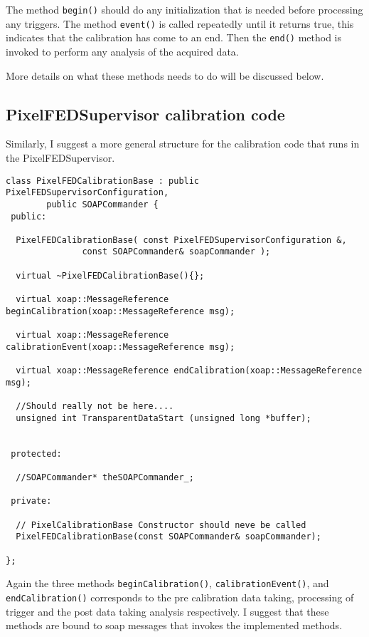 The method {\tt begin()} should do any initialization that 
is needed before processing any triggers. The method {\tt event()}
is called repeatedly until it returns true, this indicates that
the calibration has come to an end.
Then the {\tt end()}
method is invoked to perform any analysis of the acquired data.


More details on what these methods needs to do will be
discussed below.


\subsection{PixelFEDSupervisor calibration code}

Similarly, I suggest a more general structure for the calibration 
code that runs in the PixelFEDSupervisor.

\begin{verbatim}
class PixelFEDCalibrationBase : public PixelFEDSupervisorConfiguration, 
	    public SOAPCommander {
 public:

  PixelFEDCalibrationBase( const PixelFEDSupervisorConfiguration &,
			   const SOAPCommander& soapCommander );

  virtual ~PixelFEDCalibrationBase(){};

  virtual xoap::MessageReference beginCalibration(xoap::MessageReference msg);

  virtual xoap::MessageReference calibrationEvent(xoap::MessageReference msg);

  virtual xoap::MessageReference endCalibration(xoap::MessageReference msg);

  //Should really not be here....
  unsigned int TransparentDataStart (unsigned long *buffer);


 protected:

  //SOAPCommander* theSOAPCommander_;

 private:

  // PixelCalibrationBase Constructor should neve be called
  PixelFEDCalibrationBase(const SOAPCommander& soapCommander);

};
\end{verbatim}

Again the three methods {\tt beginCalibration()}, 
{\tt calibrationEvent()}, and {\tt endCalibration()}
corresponds to the pre calibration data taking, processing of trigger
and the post data taking analysis respectively. I suggest that
these methods are bound to soap messages that invokes
the implemented methods.

